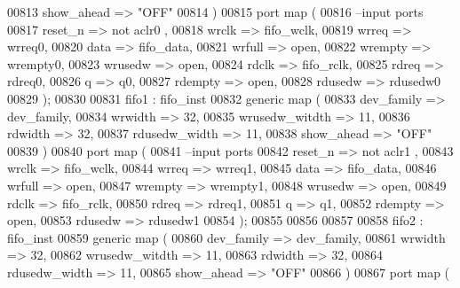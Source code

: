 \begin{DoxyCode}
00813             show_ahead      => \textcolor{keyword}{"OFF"}
00814   \textcolor{vhdlchar}{)}  
00815   \textcolor{keywordflow}{port} \textcolor{keywordflow}{map} (
00816 \textcolor{keyword}{      --input ports }
00817       reset_n       => \textcolor{keywordflow}{not} aclr0 , 
00818       wrclk         => fifo_wclk,
00819       wrreq         => wrreq0,
00820       data          => fifo_data, 
00821       wrfull        => \textcolor{keywordflow}{open},
00822         wrempty       => wrempty0, 
00823       wrusedw       => \textcolor{keywordflow}{open},
00824       rdclk          => fifo_rclk,
00825       rdreq         => rdreq0,
00826       q             => q0,
00827       rdempty       => \textcolor{keywordflow}{open},
00828       rdusedw       => rdusedw0     
00829         \textcolor{vhdlchar}{)};
00830   
00831     fifo1 :  fifo_inst 
00832   \textcolor{keywordflow}{generic} \textcolor{keywordflow}{map} (
00833             dev_family      => dev_family, 
00834             wrwidth         => \textcolor{vhdllogic}{32}, 
00835             wrusedw_witdth  => \textcolor{vhdllogic}{11}, 
00836             rdwidth         => \textcolor{vhdllogic}{32}, 
00837             rdusedw_width   => \textcolor{vhdllogic}{11},
00838             show_ahead      => \textcolor{keyword}{"OFF"}
00839   \textcolor{vhdlchar}{)}  
00840   \textcolor{keywordflow}{port} \textcolor{keywordflow}{map} (
00841 \textcolor{keyword}{      --input ports }
00842       reset_n       => \textcolor{keywordflow}{not} aclr1 , 
00843       wrclk         => fifo_wclk,
00844       wrreq         => wrreq1,
00845       data          => fifo_data, 
00846       wrfull        => \textcolor{keywordflow}{open},
00847         wrempty       => wrempty1, 
00848       wrusedw       => \textcolor{keywordflow}{open},
00849       rdclk          => fifo_rclk,
00850       rdreq         => rdreq1,
00851       q             => q1,
00852       rdempty       => \textcolor{keywordflow}{open},
00853       rdusedw       => rdusedw1     
00854         \textcolor{vhdlchar}{)};
00855   
00856   
00857   
00858       fifo2 :  fifo_inst 
00859   \textcolor{keywordflow}{generic} \textcolor{keywordflow}{map} (
00860             dev_family      => dev_family, 
00861             wrwidth         => \textcolor{vhdllogic}{32}, 
00862             wrusedw_witdth  => \textcolor{vhdllogic}{11}, 
00863             rdwidth         => \textcolor{vhdllogic}{32}, 
00864             rdusedw_width   => \textcolor{vhdllogic}{11},
00865             show_ahead      => \textcolor{keyword}{"OFF"}
00866   \textcolor{vhdlchar}{)}  
00867   \textcolor{keywordflow}{port} \textcolor{keywordflow}{map} (

\end{DoxyCode}
